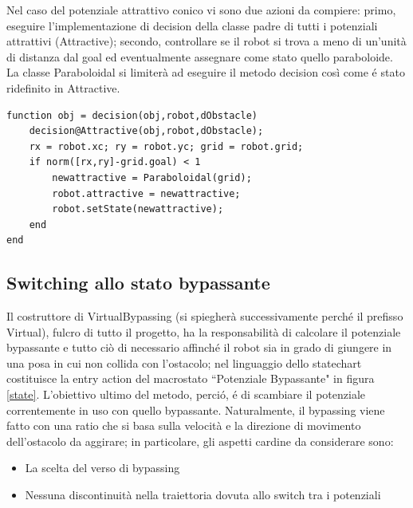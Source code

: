 \documentclass[14pt,a4paper]{extarticle}
\begin{document}
Nel caso del potenziale attrattivo conico vi sono due azioni da compiere: primo, eseguire l'implementazione di decision della classe padre di tutti i potenziali attrattivi (Attractive); secondo, controllare se il robot si trova a meno di un'unità di distanza dal goal ed eventualmente assegnare come stato quello paraboloide. La classe Paraboloidal si limiterà ad eseguire il metodo decision così come é stato ridefinito in Attractive.
\begin{lstlisting}[caption=Ridefinizione del metodo decision in Conical]
function obj = decision(obj,robot,dObstacle)
	decision@Attractive(obj,robot,dObstacle);
	rx = robot.xc; ry = robot.yc; grid = robot.grid;
	if norm([rx,ry]-grid.goal) < 1
		newattractive = Paraboloidal(grid);
		robot.attractive = newattractive;
		robot.setState(newattractive);
	end
end
\end{lstlisting}

\subsection{Switching allo stato bypassante}
Il costruttore di VirtualBypassing (si spiegherà successivamente perché il prefisso Virtual), fulcro di tutto il progetto, ha la responsabilità di calcolare il potenziale bypassante e tutto ciò di necessario affinché il robot sia in grado di giungere in una posa in cui non collida con l'ostacolo; nel linguaggio dello statechart costituisce la entry action del macrostato ``Potenziale Bypassante" in figura \ref{state}. L'obiettivo ultimo del metodo, perció, é di scambiare il potenziale correntemente in uso con quello bypassante. Naturalmente, il bypassing viene fatto con una ratio che si basa sulla velocità e la direzione di movimento dell'ostacolo da aggirare; in particolare, gli aspetti cardine da considerare sono:
\begin{itemize}
\item La scelta del verso di bypassing
\item Nessuna discontinuità nella traiettoria dovuta allo switch tra i potenziali
\end{itemize}
\end{document}
